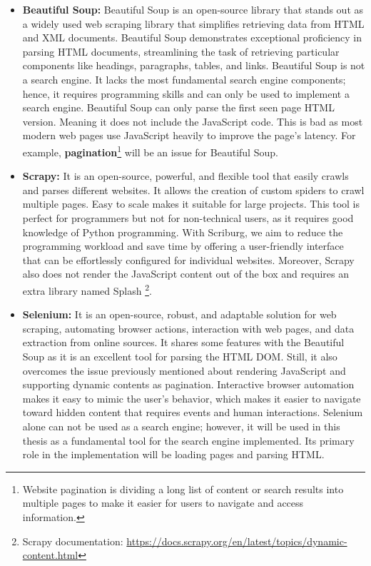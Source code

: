 \begin{itemize}
  \item[] \textbf{Beautiful Soup:} Beautiful Soup is an open-source library that stands out as a widely used web scraping library that simplifies retrieving data from HTML and XML documents. Beautiful Soup demonstrates exceptional proficiency in parsing HTML documents, streamlining the task of retrieving particular components like headings, paragraphs, tables, and links. Beautiful Soup is not a search engine. It lacks the most fundamental search engine components; hence, it requires programming skills and can only be used to implement a search engine. Beautiful Soup can only parse the first seen page HTML version. Meaning it does not include the JavaScript code. This is bad as most modern web pages use JavaScript heavily to improve the page's latency. For example, \textbf{pagination}\footnote{Website pagination is dividing a long list of content or search results into multiple pages to make it easier for users to navigate and access information.} will be an issue for Beautiful Soup.

  \item[] \textbf{Scrapy:} It is an open-source, powerful, and flexible tool that easily crawls and parses different websites. It allows the creation of custom spiders to crawl multiple pages. Easy to scale makes it suitable for large projects. This tool is perfect for programmers but not for non-technical users, as it requires good knowledge of Python programming. With Scriburg, we aim to reduce the programming workload and save time by offering a user-friendly interface that can be effortlessly configured for individual websites. Moreover, Scrapy also does not render the JavaScript content out of the box and requires an extra library named Splash \footnote{Scrapy documentation: \url{https://docs.scrapy.org/en/latest/topics/dynamic-content.html}}.

  \item[] \textbf{Selenium:} It is an open-source, robust, and adaptable solution for web scraping, automating browser actions, interaction with web pages, and data extraction from online sources. It shares some features with the Beautiful Soup as it is an excellent tool for parsing the HTML DOM. Still, it also overcomes the issue previously mentioned about rendering JavaScript and supporting dynamic contents as pagination. Interactive browser automation makes it easy to mimic the user's behavior, which makes it easier to navigate toward hidden content that requires events and human interactions. Selenium alone can not be used as a search engine; however, it will be used in this thesis as a fundamental tool for the search engine implemented. Its primary role in the implementation will be loading pages and parsing HTML.   


\end{itemize}
